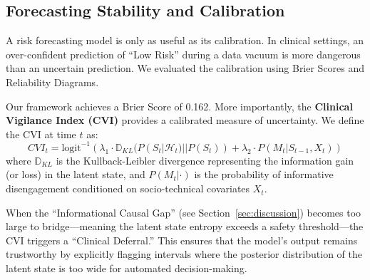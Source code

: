 \subsection{Forecasting Stability and Calibration}
A risk forecasting model is only as useful as its calibration. In clinical settings, an over-confident prediction of ``Low Risk'' during a data vacuum is more dangerous than an uncertain prediction. We evaluated the calibration using Brier Scores and Reliability Diagrams.

Our framework achieves a Brier Score of \num{0.162}. More importantly, the \textbf{Clinical Vigilance Index (CVI)} provides a calibrated measure of uncertainty. We define the CVI at time $t$ as:
\begin{equation}
    CVI_t = \text{logit}^{-1} \left( \lambda_1 \cdot \mathbb{D}_{KL}(P(S_t | \mathcal{H}_t) || P(S_t)) + \lambda_2 \cdot P(M_t | S_{t-1}, X_t) \right)
\end{equation}
where $\mathbb{D}_{KL}$ is the Kullback-Leibler divergence representing the information gain (or loss) in the latent state, and $P(M_t | \cdot)$ is the probability of informative disengagement conditioned on socio-technical covariates $X_t$.

When the ``Informational Causal Gap'' (see Section~\ref{sec:discussion}) becomes too large to bridge—meaning the latent state entropy exceeds a safety threshold—the CVI triggers a ``Clinical Deferral.'' This ensures that the model's output remains trustworthy by explicitly flagging intervals where the posterior distribution of the latent state is too wide for automated decision-making.
